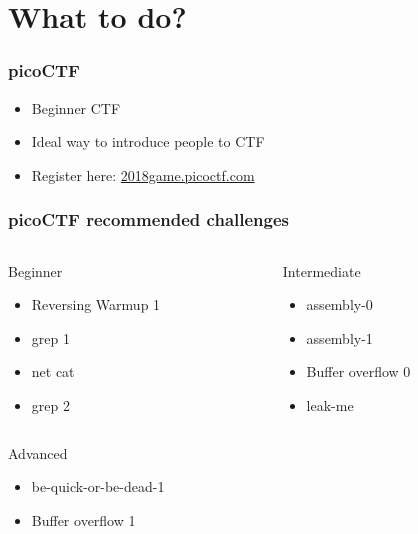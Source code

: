 \documentclass[aspectratio=169]{beamer}
\begin{document}
\section{What to do?}

\begin{frame}
    \frametitle{picoCTF}
    \begin{itemize}
        \item Beginner CTF
        \item Ideal way to introduce people to CTF
        \item Register here: \href{https://2018game.picoctf.com}{2018game.picoctf.com}
    \end{itemize}
\end{frame}

\begin{frame}
    \frametitle{picoCTF recommended challenges}
    \begin{columns}[T]
        \begin{column}{0.5\textwidth}
            Beginner
            \begin{itemize}
                \item Reversing Warmup 1
                \item grep 1
                \item net cat
                \item grep 2
            \end{itemize}
        \end{column}
        \begin{column}{0.5\textwidth}
            Intermediate
            \begin{itemize}
                \item assembly-0
                \item assembly-1
                \item Buffer overflow 0
                \item leak-me
            \end{itemize}
        \end{column}
    \end{columns}
    \vfill
    \begin{columns}[T]
        \begin{column}{0.5\textwidth}
            Advanced
            \begin{itemize}
                \item be-quick-or-be-dead-1
                \item Buffer overflow 1

\end{itemize}
\end{column}
\end{columns}
\end{frame}
\end{document}
